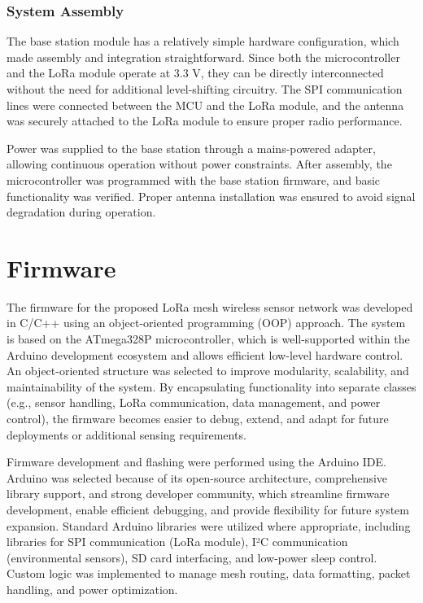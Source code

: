 \subsubsection{System Assembly}

The base station module has a relatively simple hardware configuration,
which made assembly and integration straightforward. Since both the
microcontroller and the LoRa module operate at 3.3 V, they can be
directly interconnected without the need for additional level-shifting
circuitry. The SPI communication lines were connected between the MCU
and the LoRa module, and the antenna was securely attached to the LoRa
module to ensure proper radio performance.

Power was supplied to the base station through a mains-powered adapter,
allowing continuous operation without power constraints. After assembly,
the microcontroller was programmed with the base station firmware, and
basic functionality was verified. Proper antenna installation was
ensured to avoid signal degradation during operation.

\section{Firmware}

The firmware for the proposed LoRa mesh wireless sensor network was
developed in C/C++ using an object-oriented programming (OOP) approach.
The system is based on the ATmega328P microcontroller, which is
well-supported within the Arduino development ecosystem and allows
efficient low-level hardware control. An object-oriented structure was
selected to improve modularity, scalability, and maintainability of the
system. By encapsulating functionality into separate classes (e.g.,
sensor handling, LoRa communication, data management, and power
control), the firmware becomes easier to debug, extend, and adapt for
future deployments or additional sensing requirements.

Firmware development and flashing were performed using the Arduino IDE.
Arduino was selected because of its open-source architecture,
comprehensive library support, and strong developer community, which
streamline firmware development, enable efficient debugging, and provide
flexibility for future system expansion. Standard Arduino libraries were
utilized where appropriate, including libraries for SPI communication
(LoRa module), I²C communication (environmental sensors), SD card
interfacing, and low-power sleep control. Custom logic was implemented
to manage mesh routing, data formatting, packet handling, and power
optimization.


